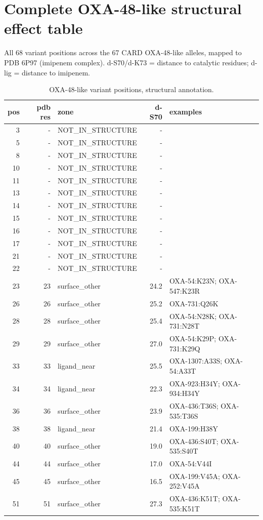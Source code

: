 \section{Complete OXA-48-like structural effect table}
All 68 variant positions across the 67 CARD OXA-48-like alleles, mapped to PDB 6P97 (imipenem complex). d-S70/d-K73 = distance to catalytic residues; d-lig = distance to imipenem.
\begin{longtable}{rrlrl}
\caption{OXA-48-like variant positions, structural annotation.}\\
\textbf{pos}&\textbf{pdb res}&\textbf{zone}&\textbf{d-S70}&\textbf{examples}\\\hline
\endhead
3&-&NOT\_IN\_STRUCTURE&-&\\
5&-&NOT\_IN\_STRUCTURE&-&\\
8&-&NOT\_IN\_STRUCTURE&-&\\
10&-&NOT\_IN\_STRUCTURE&-&\\
11&-&NOT\_IN\_STRUCTURE&-&\\
13&-&NOT\_IN\_STRUCTURE&-&\\
14&-&NOT\_IN\_STRUCTURE&-&\\
15&-&NOT\_IN\_STRUCTURE&-&\\
16&-&NOT\_IN\_STRUCTURE&-&\\
17&-&NOT\_IN\_STRUCTURE&-&\\
21&-&NOT\_IN\_STRUCTURE&-&\\
22&-&NOT\_IN\_STRUCTURE&-&\\
23&23&surface\_other&24.2&OXA-54:K23N; OXA-547:K23R\\
26&26&surface\_other&25.2&OXA-731:Q26K\\
28&28&surface\_other&25.4&OXA-54:N28K; OXA-731:N28T\\
29&29&surface\_other&27.0&OXA-54:K29P; OXA-731:K29Q\\
33&33&ligand\_near&25.5&OXA-1307:A33S; OXA-54:A33T\\
34&34&ligand\_near&22.3&OXA-923:H34Y; OXA-934:H34Y\\
36&36&surface\_other&23.9&OXA-436:T36S; OXA-535:T36S\\
38&38&ligand\_near&21.4&OXA-199:H38Y\\
40&40&surface\_other&19.0&OXA-436:S40T; OXA-535:S40T\\
44&44&surface\_other&17.0&OXA-54:V44I\\
45&45&surface\_other&16.5&OXA-199:V45A; OXA-252:V45A\\
51&51&surface\_other&27.3&OXA-436:K51T; OXA-535:K51T\\

\end{longtable}
